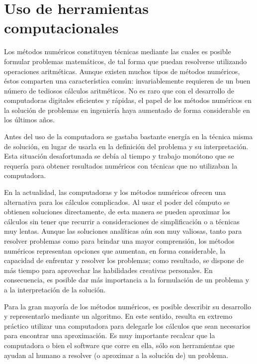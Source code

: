 \section{Uso de herramientas computacionales}
Los métodos numéricos constituyen técnicas mediante las cuales es posible formular problemas matemáticos, de tal forma que puedan resolverse
utilizando operaciones aritméticas. Aunque existen muchos tipos de métodos numéricos, éstos comparten una característica común: invariablemente
requieren de un buen número de tediosos cálculos aritméticos. No es raro que con el desarrollo de computadoras digitales eficientes y rápidas, 
el papel de los métodos numéricos en la solución de problemas en ingeniería haya aumentado de forma considerable en los últimos años.

Antes del uso de la computadora se gastaba bastante energía en la técnica misma de solución, en lugar de usarla en la definición del problema
y su interpretación. Esta situación desafortunada se debía al tiempo y trabajo monótono que se requería para obtener resultados numéricos con
técnicas que no utilizaban la computadora. 

En la actualidad, las computadoras y los métodos numéricos ofrecen una alternativa para los cálculos complicados. Al usar el poder del cómputo
se obtienen soluciones directamente, de esta manera se pueden aproximar los cálculos sin tener que recurrir a consideraciones de simplificación
o a técnicas muy lentas. Aunque las soluciones analíticas aún son muy valiosas, tanto para resolver problemas como para brindar una mayor
comprensión, los métodos numéricos representan opciones que aumentan, en forma considerable, la capacidad de enfrentar y resolver los problemas;
como resultado, se dispone de más tiempo para aprovechar las habilidades creativas personales. En consecuencia, es posible dar más importancia
a la formulación de un problema y a la interpretación de la solución.

Para la gran mayoría de los métodos numéricos, es posible describir su desarrollo y representarlo mediante un algoritmo. En este sentido, 
resulta en extremo práctico utilizar una computadora para delegarle los cálculos que sean necesarios para encontrar una aproximación. 
Es muy importante recalcar que la computadora o bien el software que corre en ella, sólo son herramientas que ayudan al humano a resolver 
(o aproximar a la solución de) un problema.